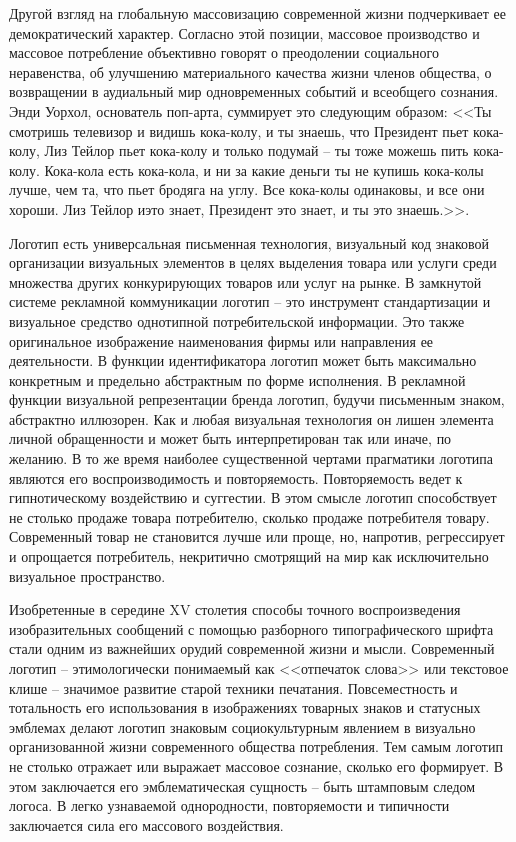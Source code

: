 Другой взгляд на глобальную массовизацию современной жизни подчеркивает ее демократический
характер. Согласно этой позиции, массовое производство и массовое потребление объективно говорят о
преодолении социального неравенства, об улучшению материального качества жизни членов общества, о
возвращении в аудиальный мир одновременных событий и всеобщего сознания. Энди Уорхол, основатель
поп-арта, суммирует это следующим образом: <<Ты смотришь телевизор и видишь кока-колу, и ты знаешь,
что Президент пьет кока-колу, Лиз Тейлор пьет кока-колу и только подумай -- ты тоже можешь пить кока-колу. Кока-кола есть кока-кола, и ни за какие деньги ты не купишь кока-колы лучше, чем та, что пьет
бродяга на углу. Все кока-колы одинаковы, и все они хороши. Лиз Тейлор иэто знает, Президент это
знает, и ты это знаешь.>>\autocite[][94]{warhol2002}. 

Логотип есть универсальная письменная технология, визуальный код знаковой организации визуальных
элементов в целях выделения товара или услуги среди множества других конкурирующих товаров или услуг
на рынке. В замкнутой системе рекламной коммуникации логотип -- это инструмент стандартизации и
визуальное средство однотипной потребительской информации. Это также оригинальное изображение
наименования фирмы или направления ее деятельности. В функции идентификатора логотип может быть
максимально конкретным и предельно абстрактным по форме исполнения. В рекламной функции визуальной
репрезентации бренда логотип, будучи письменным знаком, абстрактно иллюзорен. Как и любая визуальная
технология он лишен элемента личной обращенности и может быть интерпретирован так или иначе, по
желанию. В то же время наиболее существенной чертами прагматики логотипа являются его
воспроизводимость и повторяемость. Повторяемость ведет к гипнотическому воздействию и
суггестии. В этом смысле логотип способствует не столько продаже товара потребителю, сколько
продаже потребителя товару. Современный товар не становится лучше или проще, но, напротив,
регрессирует и опрощается потребитель, некритично смотрящий на мир как исключительно визуальное
пространство.

Изобретенные в середине XV столетия способы точного воспроизведения изобразительных сообщений с
помощью разборного типографического шрифта стали одним из важнейших орудий современной жизни и
мысли. Современный логотип -- этимологически  понимаемый как <<отпечаток слова>>  или текстовое
клише -- значимое развитие старой техники печатания. Повсеместность и тотальность его использования
в изображениях товарных знаков и статусных эмблемах  делают логотип знаковым социокультурным
явлением в визуально организованной жизни современного общества потребления. Тем самым логотип не
столько отражает или выражает массовое сознание, сколько его формирует.  В этом заключается его
эмблематическая сущность -- быть штамповым следом логоса. В легко узнаваемой однородности,
повторяемости и типичности заключается сила его массового воздействия.

